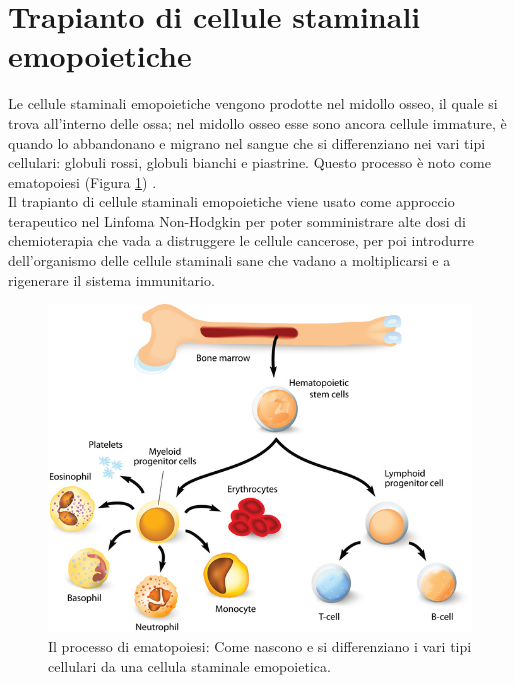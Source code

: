 \section{Trapianto di cellule staminali emopoietiche}

Le cellule staminali emopoietiche vengono prodotte nel midollo osseo, il quale si trova all’interno delle ossa; 
nel midollo osseo esse sono ancora cellule immature, è quando lo abbandonano e migrano nel sangue che si 
differenziano nei vari tipi cellulari: globuli rossi, globuli bianchi e piastrine. 
Questo processo è noto come ematopoiesi (Figura \ref{fig:FIGURE_3.14}) \cite{TRAPIANTO}.\\
Il trapianto di cellule staminali emopoietiche viene usato come approccio terapeutico nel Linfoma Non-Hodgkin per 
poter somministrare alte dosi di chemioterapia che vada a distruggere le cellule cancerose, per poi introdurre 
dell’organismo delle cellule staminali sane che vadano a moltiplicarsi e a rigenerare il sistema immunitario.

\begin{figure}[H]
    \begin{center}
    \includegraphics[width=0.5\columnwidth]{img/transplant.jpeg}
    \vspace{-3mm}
    \end{center}
    \caption{Il processo di ematopoiesi: Come nascono e si differenziano i 
    vari tipi cellulari da una cellula staminale emopoietica.
    \cite{img35}}
    \label{fig:FIGURE_3.14}
\end{figure}


